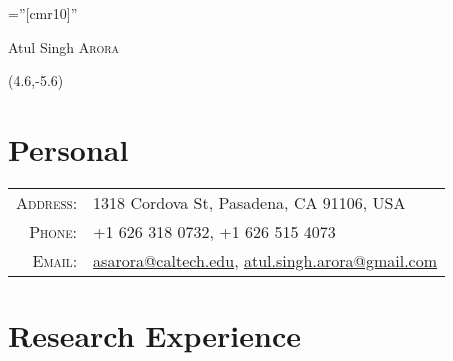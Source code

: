 \documentclass[a4paper,10pt]{article}
\begin{document}

\pagestyle{empty} %

\font\fb=''[cmr10]'' %

\par{  
		{\Huge Atul Singh \textsc{Arora}
	}  \bigskip\par}
\bigskip\bigskip\bigskip
\begin{textblock}{10}(4.6,-5.6) %
    \end{textblock}

\section{Personal}

\begin{tabular}{rl}
    \textsc{Address:}   & 1318 Cordova St, Pasadena, CA 91106, USA \\
    \textsc{Phone:}     & +1 626 318 0732,
                        +1 626 515 4073\\
    \textsc{Email:}     & \href{mailto:asarora@caltech.edu}{asarora@caltech.edu}, \href{mailto:atul.singh.arora@gmail.com}{atul.singh.arora@gmail.com}%
\end{tabular}


\section{Research Experience}
\end{document}
